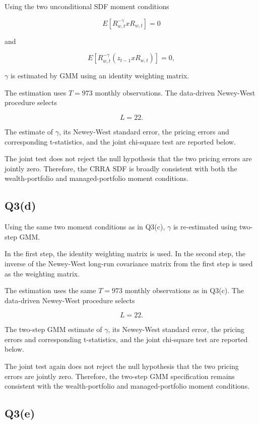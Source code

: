 \documentclass{article}
\begin{document}
Using the two unconditional SDF moment conditions

\[
E\left[R_{w,t}^{-\gamma}xR_{w,t}\right]=0
\]

and

\[
E\left[
R_{w,t}^{-\gamma}
\left(z_{t-1}xR_{w,t}\right)
\right]=0,
\]

\(\gamma\) is estimated by GMM using an identity weighting matrix.

The estimation uses \(T=973\) monthly observations. The data-driven Newey-West procedure selects

\[
L=22.
\] 

The estimate of \(\gamma\), its Newey-West standard error, the pricing errors and corresponding t-statistics, and the joint chi-square test are reported below.



The joint test does not reject the null hypothesis that the two pricing errors are jointly zero. Therefore, the CRRA SDF is broadly consistent with both the wealth-portfolio and managed-portfolio moment conditions.

\subsection{Q3(d)}

Using the same two moment conditions as in Q3(c), \(\gamma\) is re-estimated using two-step GMM.

In the first step, the identity weighting matrix is used. In the second step, the inverse of the Newey-West long-run covariance matrix from the first step is used as the weighting matrix.

The estimation uses the same \(T=973\) monthly observations as in Q3(c). The data-driven Newey-West procedure selects

\[
L=22.
\]

The two-step GMM estimate of \(\gamma\), its Newey-West standard error, the pricing errors and corresponding t-statistics, and the joint chi-square test are reported below.



The joint test again does not reject the null hypothesis that the two pricing errors are jointly zero. Therefore, the two-step GMM specification remains consistent with the wealth-portfolio and managed-portfolio moment conditions.


\subsection{Q3(e)}
\end{document}
